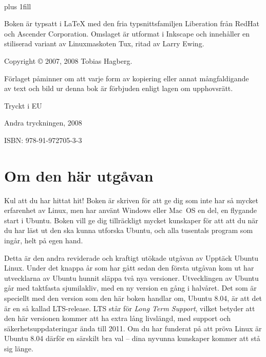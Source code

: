\documentclass[a4paper,final]{memoir} %
\begin{document}
\newpage 

\pagestyle{xempty}

{\small{


~

\vskip 0pt plus 1fill


\noindent Boken är typsatt i \LaTeX{} med den fria typsnittsfamiljen Liberation från RedHat och Ascender Corporation. Omslaget är utformat i Inkscape och innehåller en stiliserad variant av Linuxmaskoten Tux, ritad av Larry Ewing.

\medskip

\noindent Copyright \copyright{} 2007, 2008 Tobias Hagberg. 

\medskip

\noindent Förlaget påminner om att varje form av kopiering eller annat mångfaldigande \\
\noindent av text och bild ur denna bok är förbjuden enligt lagen om upphovsrätt.

\medskip

\noindent Tryckt i EU

\medskip

\noindent Andra tryckningen, 2008

\medskip

\noindent ISBN: 978-91-972705-3-3

}}

\newpage 

\pagestyle{lfng}

\chapter{Om den här utgåvan}

Kul att du har hittat hit! Boken är skriven för att ge dig som inte har så mycket erfarenhet av Linux, men har använt Windows eller Mac~OS en del, en flygande start i Ubuntu. Boken vill ge dig tillräckligt mycket kunskaper för att att du när du har läst ut den ska kunna utforska Ubuntu, och alla tusentals program som ingår, helt på egen hand.

Detta är den andra reviderade och kraftigt utökade utgåvan av Upptäck Ubuntu Linux. Under det knappa år som har gått sedan den första utgåvan kom ut har utvecklarna av Ubuntu hunnit släppa två nya versioner. Utvecklingen av Ubuntu går med taktfasta sjumilakliv, med en ny version en gång i halvåret. Det som är speciellt med den version som den här boken handlar om, Ubuntu 8.04, är att det är en så kallad LTS-release. LTS står för \textit{Long Term Support}, vilket betyder att den här versionen kommer att ha extra lång livslängd, med support och säkerhetsuppdateringar ända till 2011. Om du har funderat på att pröva Linux är Ubuntu 8.04 därför en särskilt bra val -- dina nyvunna kunskaper kommer att stå sig länge. 
\end{document}
